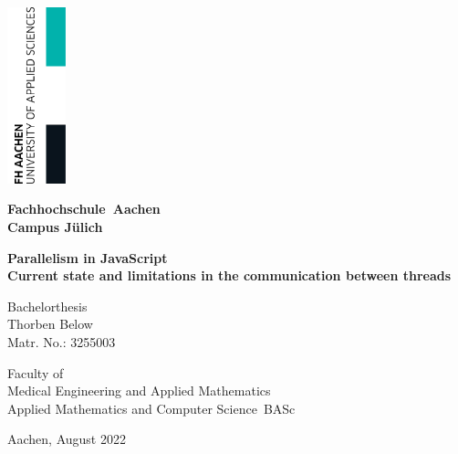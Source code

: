 \begin{titlepage}

	\thispagestyle{empty}

	\begin{flushright}
		\includegraphics[width=1.7cm]{./assets/FHAC.jpg}
	\end{flushright}
	\vspace{-2.5cm}

	\centering \bfseries \Large Fachhochschule~Aachen \\Campus Jülich
	\vspace{2.5cm}
	\normalsize

	\centering \begin{minipage}[t]{17cm}
		\centering \bfseries \large Parallelism in JavaScript \\Current state and limitations in the communication between threads
		\medskip
	\end{minipage}

	\vspace{2.5cm}

	\begin{minipage}[t]{9cm}
		\centering Bachelorthesis \\
		\centering Thorben Below \\ Matr. No.: 3255003
	\end{minipage}

	\vspace{3cm}
	\normalsize Faculty of\\
	Medical Engineering and Applied Mathematics \\
	Applied Mathematics and Computer Science~BASc
	\vspace{2.1cm}

	\vspace{2cm}
	\centering %
	\begin{minipage}[b]{7cm}
		\centering
		Aachen, August 2022\\
	\end{minipage}

	\restoregeometry

\end{titlepage}

